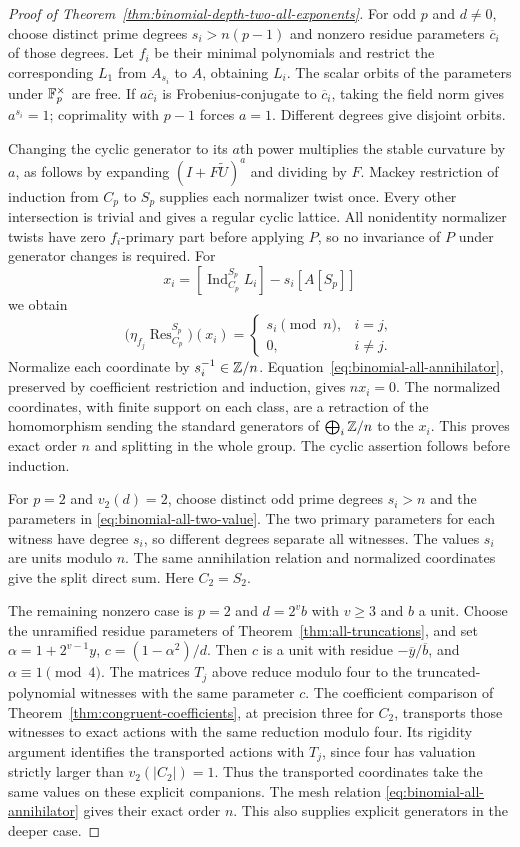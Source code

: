 \begin{proof}[Proof of Theorem~\ref{thm:binomial-depth-two-all-exponents}]
For odd $p$ and $d\ne0$, choose distinct prime degrees
$s_i>n(p-1)$ and nonzero residue parameters
$\overline c_i$ of those degrees.
Let $f_i$ be their minimal polynomials and restrict the
corresponding $L_1$ from $A_{s_i}$ to $A$, obtaining $L_i$.
The scalar orbits of the parameters under $\mathbb F_p^\times$
are free.  If $a\overline c_i$ is Frobenius-conjugate to
$\overline c_i$, taking the field norm gives $a^{s_i}=1$;
coprimality with $p-1$ forces $a=1$.
Different degrees give disjoint orbits.

Changing the cyclic generator to its $a$th power multiplies
the stable curvature by $a$, as follows by expanding
$(I+F\widetilde U)^a$ and dividing by $F$.
Mackey restriction of induction from $C_p$ to $S_p$ supplies
each normalizer twist once.  Every other intersection is
trivial and gives a regular cyclic lattice.
All nonidentity normalizer twists have zero $f_i$-primary
part before applying $P$, so no invariance of $P$ under
generator changes is required.
For
\[
 x_i=[\operatorname{Ind}_{C_p}^{S_p}L_i]
                            -s_i[A[S_p]]
\]
we obtain
\[
 \bigl(\eta_{f_j}\operatorname{Res}_{C_p}^{S_p}\bigr)(x_i)
 =\begin{cases}s_i\pmod n,&i=j,\\0,&i\ne j.\end{cases}
\]
Normalize each coordinate by $s_i^{-1}\in\mathbb Z/n$.
Equation~\eqref{eq:binomial-all-annihilator}, preserved by
coefficient restriction and induction, gives $nx_i=0$.
The normalized coordinates, with finite support on each
class, are a retraction of the homomorphism sending the
standard generators of $\bigoplus_i\mathbb Z/n$ to the $x_i$.
This proves exact order $n$ and splitting in the whole group.
The cyclic assertion follows before induction.

For $p=2$ and $v_2(d)=2$, choose distinct odd prime degrees
$s_i>n$ and the parameters in
\eqref{eq:binomial-all-two-value}.
The two primary parameters for each witness have degree
$s_i$, so different degrees separate all witnesses.
The values $s_i$ are units modulo $n$.
The same annihilation relation and normalized coordinates
give the split direct sum.  Here $C_2=S_2$.

The remaining nonzero case is $p=2$ and $d=2^v b$ with
$v\ge3$ and $b$ a unit.  Choose the unramified residue parameters
of Theorem~\ref{thm:all-truncations}, and set
$\alpha=1+2^{v-1}y$, $c=(1-\alpha^2)/d$.
Then $c$ is a unit with residue $-\overline y/\overline b$,
and $\alpha\equiv1\pmod4$.  The matrices $T_j$ above reduce
modulo four to the truncated-polynomial witnesses with the same
parameter $c$.  The coefficient comparison of
Theorem~\ref{thm:congruent-coefficients}, at precision three for
$C_2$, transports those witnesses to exact actions with the same
reduction modulo four.  Its rigidity argument identifies the
transported actions with $T_j$, since four has valuation strictly
larger than $v_2(|C_2|)=1$.  Thus the transported coordinates take
the same values on these explicit companions.  The mesh relation
\eqref{eq:binomial-all-annihilator} gives their exact order $n$.
This also supplies explicit generators in the deeper case.


\end{proof}
